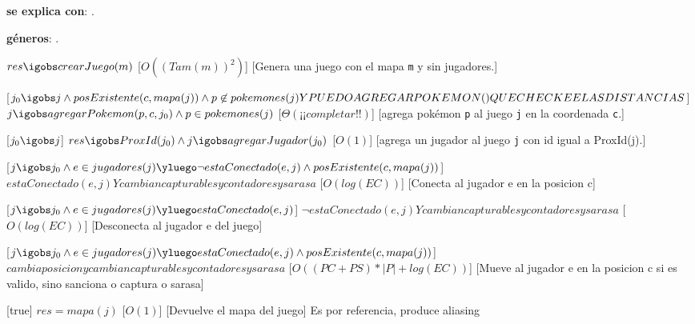 \begin{Interfaz}


\textbf{se explica con}: .

\textbf{g\'eneros}: .






%
{$res \igobs crearJuego(m)$}%
[$O((Tam(m))^2)$]
[Genera una juego con el mapa \texttt{m} y sin jugadores.]


[$j_0 \igobs j \land posExistente(c, mapa(j)) \land p \not \in pokemones(j) Y PUEDOAGREGARPOKEMON() QUE CHECKEE LAS DISTANCIAS $]  
{$j \igobs agregarPokemon(p, c, j_0)  \land p \in pokemones(j)$}
[$\Theta(¡¡completar!!)$]
[agrega pok\'emon \texttt{p} al juego \texttt{j} en la coordenada \texttt{c}.]


[$ j_0 \igobs j $]
{$res \igobs ProxId(j_0) \land j \igobs agregarJugador(j_0)$}%
[$O(1)$]
[agrega un jugador al juego \texttt{j} con id igual a ProxId(j).]


%
[$j \igobs j_0 \land e \in jugadores(j) \yluego \neg estaConectado(e, j) \land posExistente(c, mapa(j)) $]
{$estaConectado(e, j) Y cambian capturables y contadores y sarasa$}%
[$O(log(EC))$] %
[Conecta al jugador e en la posicion c]


%
[$j \igobs j_0 \land e \in jugadores(j) \yluego estaConectado(e, j)$]
{$\neg estaConectado(e, j) Y cambian capturables y contadores y sarasa$}%
[$O(log(EC))$] %
[Desconecta al jugador e del juego]


%
[$j \igobs j_0 \land e \in jugadores(j) \yluego estaConectado(e, j) \land posExistente(c, mapa(j)) $]
{$cambia posicion y cambian capturables y contadores y sarasa$}%
[$O((PC + PS) * |P| + log(EC))$] %
[Mueve al jugador e en la posicion c si es valido, sino sanciona o captura o sarasa]


%
[true]
{$res = mapa(j)$}%
[$O(1)$] %
[Devuelve el mapa del juego]
{Es por referencia, produce aliasing}



\end{Interfaz}
